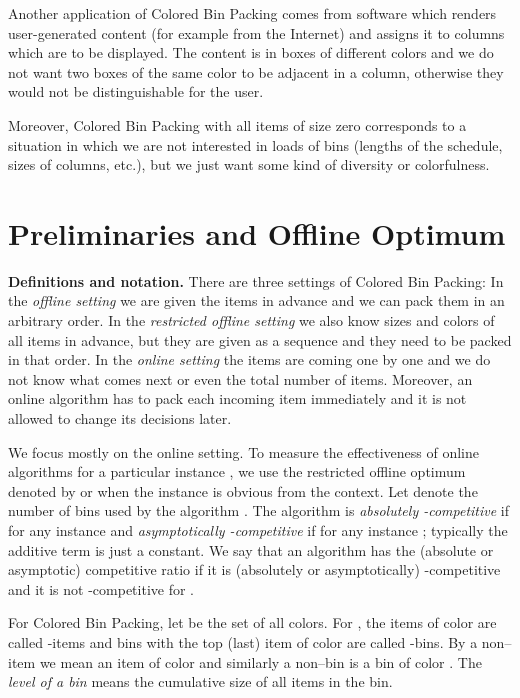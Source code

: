 \documentclass[11pt,a4paper]{article}
\begin{document}
Another application of Colored Bin Packing comes from software which
renders user-generated content (for example from the
Internet) and assigns it to columns which are to be displayed.
The content is in boxes of different colors and we do not want
two boxes of the same color to be adjacent in a column,
otherwise they would not be distinguishable for the user.

Moreover, Colored Bin Packing with all items of size zero corresponds
to a situation in which we are not interested in loads of bins
(lengths of the schedule, sizes of columns, etc.), but we just want
some kind of diversity or colorfulness.

\section{Preliminaries and Offline Optimum}\label{sec:Prelim}

\textbf{Definitions and notation.}
There are three settings of Colored Bin Packing:
In the \textit{offline setting} we are given the items in advance
and we can pack them in an arbitrary order.
In the \textit{restricted offline setting} we also know sizes and colors of all items in advance,
but they are given as a sequence and they need to be packed in that order.
In the \textit{online setting} the items are coming one by one and we do not
know what comes next or even the total number of items. 
Moreover, an online algorithm has to pack each incoming item immediately
and it is not allowed to change its decisions later.

We focus mostly on the online setting.  To measure the effectiveness
of online algorithms for a particular instance , we use the
restricted offline optimum denoted by  or 
when the instance  is obvious from the context.  Let
 denote the number of bins used by the algorithm
.  The algorithm is \textit{absolutely -competitive} if
for any instance  and
\textit{asymptotically -competitive} if for any instance
;
typically the additive term is just a constant.  We say that an
algorithm has the (absolute or asymptotic) competitive ratio 
if it is (absolutely or asymptotically) -competitive and it is
not -competitive for .

For Colored Bin Packing, let  be the set of all colors. For , the items of color  are called -items and bins with the top (last)
item of color  are called -bins. By a non--item we mean an item of
color  and similarly a non--bin is a bin of 
color .  The \textit{level of a bin} means the cumulative size
of all items in the bin.
\end{document}
